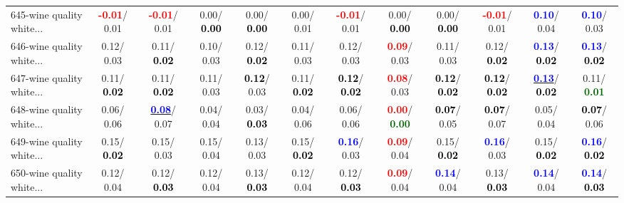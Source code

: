 \begin{table}[h]
\begin{center}
{\begin{tabular}{lc|c|c|c|c|c|c|c|c|c|c}
645-wine quality white... & \textcolor{red}{\textbf{ -0.01}}/  0.01 & \textcolor{red}{\textbf{ -0.01}}/  0.01 &   0.00/\textcolor{black}{\textbf{  0.00}} &   0.00/\textcolor{black}{\textbf{  0.00}} &   0.00/  0.01 & \textcolor{red}{\textbf{ -0.01}}/  0.01 &   0.00/\textcolor{black}{\textbf{  0.00}} &   0.00/\textcolor{black}{\textbf{  0.00}} & \textcolor{red}{\textbf{ -0.01}}/  0.01 & \textcolor{blue}{\textbf{  0.10}}/  0.04 & \textcolor{blue}{\textbf{  0.10}}/  0.03 \\
646-wine quality white... &   0.12/  0.03 &   0.11/\textcolor{black}{\textbf{  0.02}} &   0.10/  0.03 &   0.12/\textcolor{black}{\textbf{  0.02}} &   0.11/  0.03 &   0.12/  0.03 & \textcolor{red}{\textbf{  0.09}}/  0.03 &   0.11/  0.03 &   0.12/\textcolor{black}{\textbf{  0.02}} & \textcolor{blue}{\textbf{  0.13}}/\textcolor{black}{\textbf{  0.02}} & \textcolor{blue}{\textbf{  0.13}}/\textcolor{black}{\textbf{  0.02}} \\
647-wine quality white... &   0.11/\textcolor{black}{\textbf{  0.02}} &   0.11/\textcolor{black}{\textbf{  0.02}} &   0.11/  0.03 & \textcolor{black}{\textbf{  0.12}}/  0.03 &   0.11/\textcolor{black}{\textbf{  0.02}} & \textcolor{black}{\textbf{  0.12}}/\textcolor{black}{\textbf{  0.02}} & \textcolor{red}{\textbf{  0.08}}/  0.03 & \textcolor{black}{\textbf{  0.12}}/\textcolor{black}{\textbf{  0.02}} & \textcolor{black}{\textbf{  0.12}}/\textcolor{black}{\textbf{  0.02}} & \underline{\textcolor{blue}{\textbf{  0.13}}}/\textcolor{black}{\textbf{  0.02}} &   0.11/\textcolor{darkgreen}{\textbf{  0.01}} \\ \hline
648-wine quality white... &   0.06/  0.06 & \underline{\textcolor{blue}{\textbf{  0.08}}}/  0.07 &   0.04/  0.04 &   0.03/\textcolor{black}{\textbf{  0.03}} &   0.04/  0.06 &   0.06/  0.06 & \textcolor{red}{\textbf{  0.00}}/\textcolor{darkgreen}{\textbf{  0.00}} & \textcolor{black}{\textbf{  0.07}}/  0.05 & \textcolor{black}{\textbf{  0.07}}/  0.07 &   0.05/  0.04 & \textcolor{black}{\textbf{  0.07}}/  0.06 \\
649-wine quality white... &   0.15/\textcolor{black}{\textbf{  0.02}} &   0.15/  0.03 &   0.15/  0.04 &   0.13/  0.03 &   0.15/\textcolor{black}{\textbf{  0.02}} & \textcolor{blue}{\textbf{  0.16}}/  0.03 & \textcolor{red}{\textbf{  0.09}}/  0.04 &   0.15/\textcolor{black}{\textbf{  0.02}} & \textcolor{blue}{\textbf{  0.16}}/  0.03 &   0.15/\textcolor{black}{\textbf{  0.02}} & \textcolor{blue}{\textbf{  0.16}}/\textcolor{black}{\textbf{  0.02}} \\
650-wine quality white... &   0.12/  0.04 &   0.12/\textcolor{black}{\textbf{  0.03}} &   0.12/  0.04 &   0.13/\textcolor{black}{\textbf{  0.03}} &   0.12/  0.04 &   0.12/\textcolor{black}{\textbf{  0.03}} & \textcolor{red}{\textbf{  0.09}}/  0.04 & \textcolor{blue}{\textbf{  0.14}}/  0.04 &   0.13/\textcolor{black}{\textbf{  0.03}} & \textcolor{blue}{\textbf{  0.14}}/  0.04 & \textcolor{blue}{\textbf{  0.14}}/\textcolor{black}{\textbf{  0.03}} \\

\end{tabular}}
\end{center}
\end{table}
